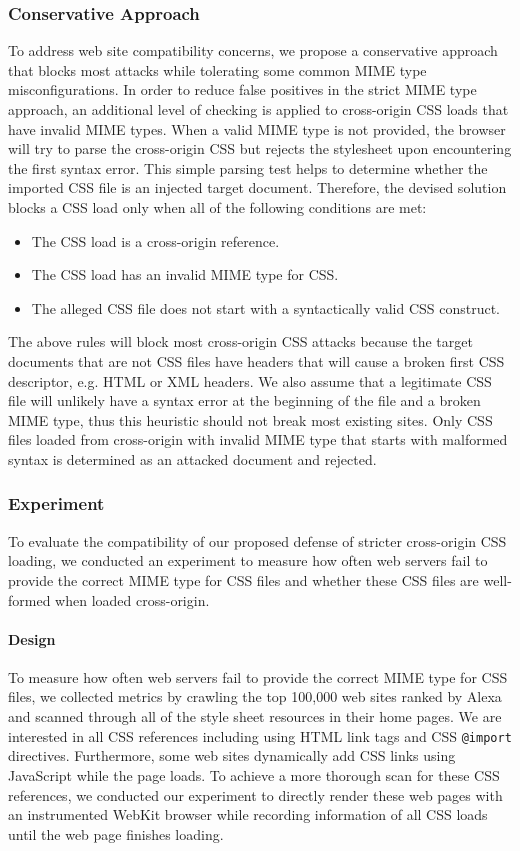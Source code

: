 \documentclass{acm_proc_article-sp}
\begin{document}
\subsubsection{Conservative Approach}
To address web site compatibility concerns, we propose a conservative approach that blocks most attacks while tolerating some common MIME type misconfigurations. In order to reduce false positives in the strict MIME type approach, an additional level of checking is applied to cross-origin CSS loads that have invalid MIME types. When a valid MIME type is not provided, the browser will try to parse the cross-origin CSS but rejects the stylesheet upon encountering the first syntax error. This simple parsing test helps to determine whether the imported CSS file is an injected target document. Therefore, the devised solution blocks a CSS load only when all of the following conditions are met:
\begin{itemize}
\item{The CSS load is a cross-origin reference.}
\item{The CSS load has an invalid MIME type for CSS.}
\item{The alleged CSS file does not start with a syntactically valid CSS construct.}
\end{itemize}
The above rules will block most cross-origin CSS attacks because the target documents that are not CSS files have headers that will cause a broken first CSS descriptor, e.g. HTML or XML headers. We also assume that a legitimate CSS file will unlikely have a syntax error at the beginning of the file and a broken MIME type, thus this heuristic should not break most existing sites. Only CSS files loaded from cross-origin with invalid MIME type that starts with malformed syntax is determined as an attacked document and rejected.

\subsubsection{Experiment}
To evaluate the compatibility of our proposed defense of stricter cross-origin CSS loading, we conducted an experiment to measure how often web servers fail to provide the correct MIME type for CSS files and whether these CSS files are well-formed when loaded cross-origin.

\paragraph{Design}
To measure how often web servers fail to provide the correct MIME type for CSS files, we collected metrics by crawling the top 100,000 web sites ranked by Alexa~\cite{alexa} and scanned through all of the style sheet resources in their home pages. We are interested in all CSS references including using HTML link tags and CSS \texttt{@import} directives. Furthermore, some web sites dynamically add CSS links using JavaScript while the page loads. To achieve a more thorough scan for these CSS references, we conducted our experiment to directly render these web pages with an instrumented WebKit browser while recording information of all CSS loads until the web page finishes loading.
\end{document}

